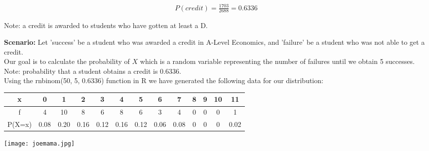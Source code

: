 \documentclass{article}
\begin{document}
\begin{gather*}
  P(credit) = \frac{1703}{2688} = 0.6336
\end{gather*}

Note: a credit is awarded to students who have gotten at least a D.\\


\pagebreak

\textbf{Scenario:}
Let 'success' be a student who was awarded a credit in A-Level Economics,
and 'failure' be a student who was not able to get a credit. \\

Our goal is to calculate the probability of $X$ which is a random variable
representing the number of failures until we obtain 5 successes. \\

Note: probability that a student obtains a credit is 0.6336.
\\



Using the rnbinom(50, 5, 0.6336) function in R we have generated the
following
data for our distribution:

\begin{center}
  \begin{tabular}{|c|c|c|c|c|c|c|c|c|c|c|c|c|}
    \hline
    x & 0 & 1 & 2 & 3 & 4 & 5 & 6 & 7 & 8 & 9 & 10 & 11 \\
    \hline
    f & 4 & 10 & 8 & 6 & 8 & 6 & 3 & 4 & 0 & 0 & 0 & 1\\
    \hline
    P(X=x) & 0.08 & 0.20 & 0.16 & 0.12 & 0.16 & 0.12 & 0.06 & 0.08 & 0 & 0 & 0 & 0.02 \\
    \hline
  \end{tabular}
\end{center}


\begin{center}
  \texttt{[image: joemama.jpg]}
\end{center}
\end{document}
